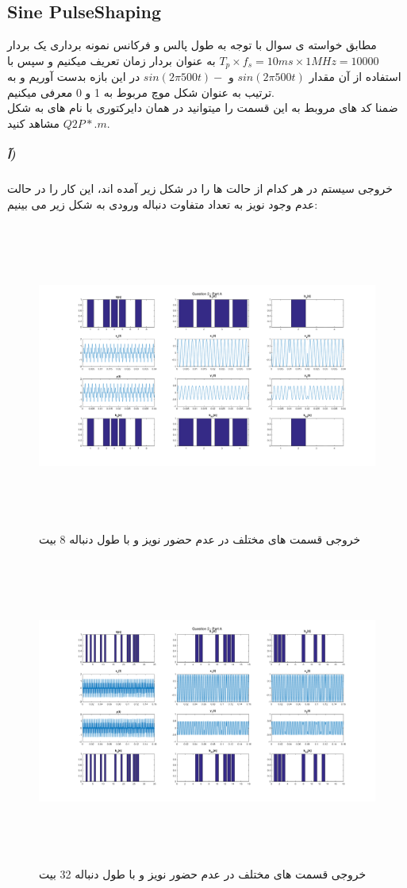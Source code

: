 \documentclass[a4paper,12pt]{article}
\begin{document}
\subsection{Sine PulseShaping}
مطابق خواسته ی سوال با توجه به طول پالس و فرکانس نمونه برداری یک بردار $T_p \times f_s = 10ms \times 1MHz = 10000 $ به عنوان بردار زمان تعریف میکنیم و سپس با استفاده از آن مقدار $sin(2\pi500t)$ و $sin(2\pi500t)-$ در این بازه بدست آوریم و به ترتیب به عنوان شکل موچ مربوط به 1 و 0 معرفی میکنیم.
\\
ضمنا کد های مروبط به این قسمت را میتوانید در همان دایرکتوری با نام های به شکل $Q2P*.m$ مشاهد کنید.
\subparagraph{آ)}
خروجی سیستم در هر کدام از حالت ها را در شکل زیر آمده اند، این کار را در حالت عدم وجود نویز به تعداد متفاوت دنباله ورودی به شکل زیر می بینیم:
\begin{figure}[htbp]
\centerline{\includegraphics[width=6.625in, height=4in]{../3.Transferring0and1/Q2PA_8.png}}
\caption{خروجی قسمت های مختلف در عدم حضور نویز و با طول دنباله 8 بیت}
\label{fig}
\end{figure}
\begin{figure}[htbp]
\centerline{\includegraphics[width=6.625in, height=4in]{../3.Transferring0and1/Q2PA_32.png}}
\caption{خروجی قسمت های مختلف در عدم حضور نویز و با طول دنباله 32 بیت}
\label{fig}
\end{figure}
\end{document}

